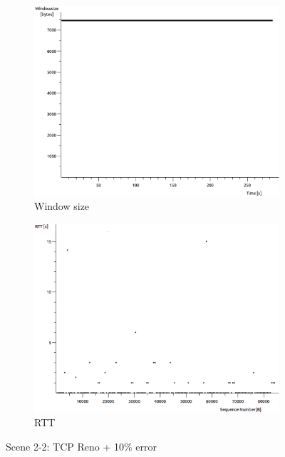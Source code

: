 \documentclass[conference,a4paper]{../../sty/IEEEtran}
\begin{document}
\begin{figure}
\begin{subfigure}[b]{0.2\textwidth}
  \includegraphics[width=\textwidth]{s2-2_wnd}
  \caption{Window size}
 \end{subfigure}
 \begin{subfigure}[b]{0.2\textwidth}
  \includegraphics[width=\textwidth]{s2-2_rtt}
  \caption{RTT}
 \end{subfigure}
 \caption{Scene 2-2: TCP Reno + 10\% error}
\end{figure}
\end{document}
